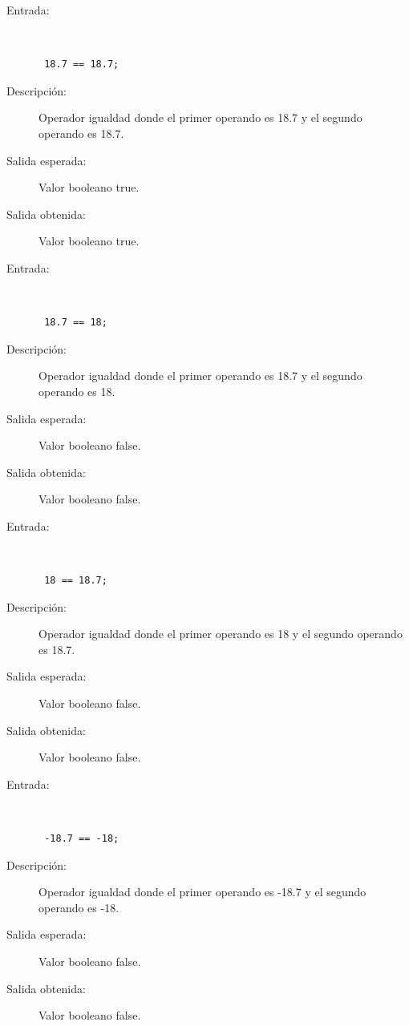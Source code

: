 \begin{framed}
	\begin{description}
		\item [Entrada:] \hfill \\
\begin{lstlisting}
 18.7 == 18.7;
\end{lstlisting}
		\item [Descripción:] Operador igualdad donde el primer operando es 18.7 y el segundo operando es  18.7.
		\item [Salida esperada:] Valor booleano true.
		\item [Salida obtenida:] Valor booleano true.
	\end{description}
\end{framed}

\begin{framed}
	\begin{description}
		\item [Entrada:] \hfill \\
\begin{lstlisting}
 18.7 == 18;
\end{lstlisting}
		\item [Descripción:] Operador igualdad donde el primer operando es 18.7 y el segundo operando es  18.
		\item [Salida esperada:] Valor booleano false.
		\item [Salida obtenida:] Valor booleano false.
	\end{description}
\end{framed}

\begin{framed}
	\begin{description}
		\item [Entrada:] \hfill \\
\begin{lstlisting}
 18 == 18.7;
\end{lstlisting}
		\item [Descripción:] Operador igualdad donde el primer operando es 18 y el segundo operando es  18.7.
		\item [Salida esperada:] Valor booleano false.
		\item [Salida obtenida:] Valor booleano false.
	\end{description}
\end{framed}

\begin{framed}
	\begin{description}
		\item [Entrada:] \hfill \\
\begin{lstlisting}
 -18.7 == -18;
\end{lstlisting}
		\item [Descripción:] Operador igualdad donde el primer operando es -18.7 y el segundo operando es  -18.
		\item [Salida esperada:] Valor booleano false.
		\item [Salida obtenida:] Valor booleano false.
	\end{description}
\end{framed}


